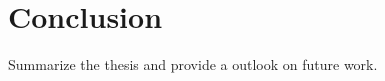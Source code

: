 \section{Conclusion}\label{chap:conclusion}

Summarize the thesis and provide a outlook on future work.  
